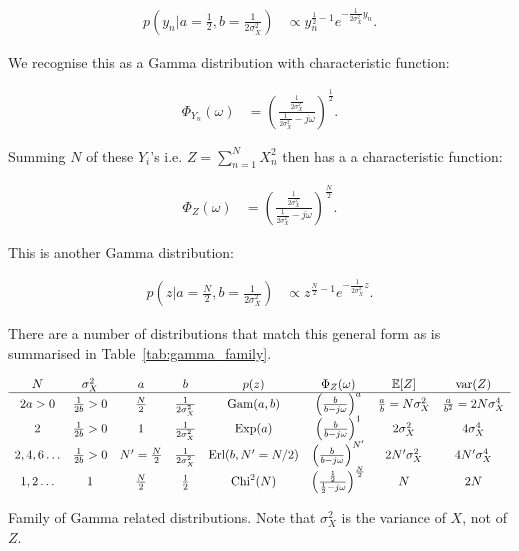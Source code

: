 \begin{align*}
p(y_{n}|a=\frac{1}{2},b=\frac{1}{2\sigma_{X}^{2}}) & \propto y_{n}^{\frac{1}{2}-1}e^{-\frac{1}{2\sigma_{X}^{2}}y_{n}}.
\end{align*}


We recognise this as a Gamma distribution with characteristic function:

\begin{align*}
\Phi_{Y_{n}}(\omega) & =\left(\frac{\frac{1}{2\sigma_{X}^{2}}}{\frac{1}{2\sigma_{X}^{2}}-j\omega}\right)^{\frac{1}{2}}.
\end{align*}


Summing $N$ of these $Y_{i}$'s i.e. $Z=\sum_{n=1}^{N}X_{n}^{2}$
then has a a characteristic function:

\begin{align*}
\Phi_{Z}(\omega) & =\left(\frac{\frac{1}{2\sigma_{X}^{2}}}{\frac{1}{2\sigma_{X}^{2}}-j\omega}\right)^{\frac{N}{2}}.
\end{align*}


This is another Gamma distribution:

\begin{align*}
p(z|a=\frac{N}{2},b=\frac{1}{2\sigma_{X}^{2}}) & \propto z^{\frac{N}{2}-1}e^{-\frac{1}{2\sigma_{X}^{2}}z}.
\end{align*}


There are a number of distributions that match this general form as
is summarised in Table~\ref{tab:gamma_family}.

\begin{table}
\noindent \begin{centering}
$\begin{array}{cccccccc}
N & \sigma_{X}^{2} & a & b & p(z) & \Phi_{Z}(\omega) & \mathbb{E}[Z] & \text{var}(Z)\\
\hline 2a>0 & \frac{1}{2b}>0 & \frac{N}{2} & \frac{1}{2\sigma_{X}^{2}} & \text{Gam}(a,b) & \left(\frac{b}{b-j\omega}\right)^{a} & \frac{a}{b}=N\sigma_{X}^{2} & \frac{a}{b^{2}}=2N\sigma_{X}^{4}\\
2 & \frac{1}{2b}>0 & 1 & \frac{1}{2\sigma_{X}^{2}} & \text{Exp}(a) & \left(\frac{b}{b-j\omega}\right)^{1} & 2\sigma_{X}^{2} & 4\sigma_{X}^{4}\\
2,4,6\ldots & \frac{1}{2b}>0 & N'=\frac{N}{2} & \frac{1}{2\sigma_{X}^{2}} & \text{\ensuremath{\text{Erl}(b,N'=N/2)}} & \left(\frac{b}{b-j\omega}\right)^{N'} & 2N'\sigma_{X}^{2} & 4N'\sigma_{X}^{4}\\
1,2\ldots & 1 & \frac{N}{2} & \frac{1}{2} & \text{Chi}^{2}(N) & \left(\frac{\frac{1}{2}}{\frac{1}{2}-j\omega}\right)^{\frac{N}{2}} & N & 2N
\end{array}$
\par\end{centering}

\caption{Family of Gamma related distributions. Note that $\sigma_{X}^{2}$
is the variance of $X$, not of $Z$.}


\label{tab:gamma_family}
\end{table}


